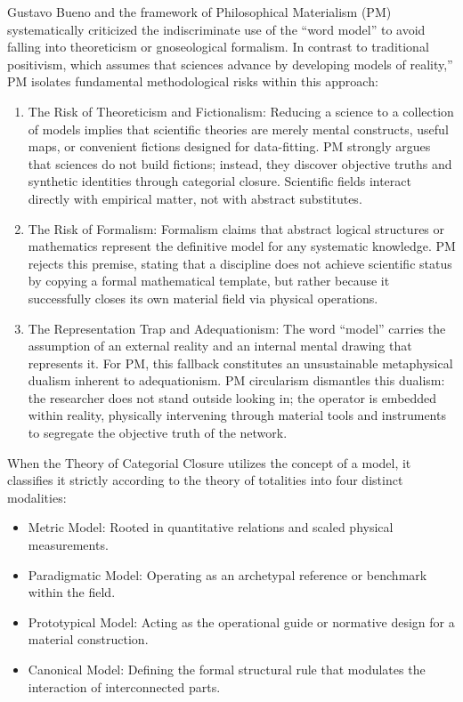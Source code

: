 \documentclass[11pt, a4paper]{article}
\begin{document}
Gustavo Bueno and the framework of Philosophical Materialism (PM) systematically criticized the indiscriminate use of the ``word model'' to avoid falling into theoreticism or gnoseological formalism. In contrast to traditional positivism, which assumes that sciences advance by developing models of reality,'' PM isolates fundamental methodological risks within this approach:

\begin{enumerate}
\item {The Risk of Theoreticism and Fictionalism:} Reducing a science to a collection of models implies that scientific theories are merely mental constructs, useful maps, or convenient fictions designed for data-fitting. PM strongly argues that sciences do not build fictions; instead, they discover objective truths and synthetic identities through categorial closure. Scientific fields interact directly with empirical matter, not with abstract substitutes.
\item {The Risk of Formalism:} Formalism claims that abstract logical structures or mathematics represent the definitive model for any systematic knowledge. PM rejects this premise, stating that a discipline does not achieve scientific status by copying a formal mathematical template, but rather because it successfully closes its own material field via physical operations.
\item {The Representation Trap and Adequationism:} The word ``model'' carries the assumption of an external reality and an internal mental drawing that represents it. For PM, this fallback constitutes an unsustainable metaphysical dualism inherent to adequationism. PM circularism dismantles this dualism: the researcher does not stand outside looking in; the operator is embedded within reality, physically intervening through material tools and instruments to segregate the objective truth of the network.
\end{enumerate}


When the Theory of Categorial Closure utilizes the concept of a model, it classifies it strictly according to the theory of totalities into four distinct modalities:

\begin{itemize}
\item {Metric Model:} Rooted in quantitative relations and scaled physical measurements.
\item {Paradigmatic Model:} Operating as an archetypal reference or benchmark within the field.
\item {Prototypical Model:} Acting as the operational guide or normative design for a material construction.
\item {Canonical Model:} Defining the formal structural rule that modulates the interaction of interconnected parts.
\end{itemize}
\end{document}

